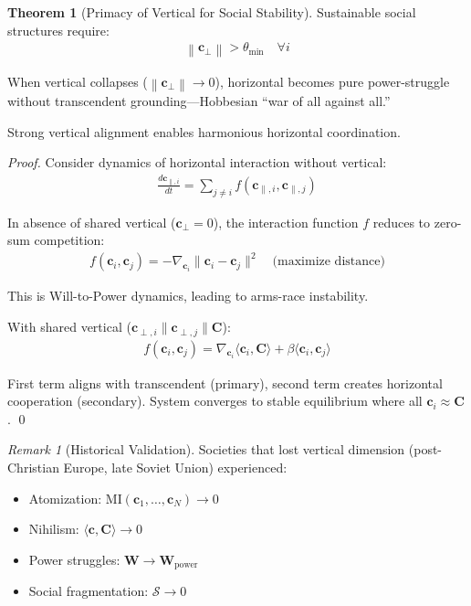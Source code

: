 \documentclass[11pt,a4paper]{article}
\theoremstyle{definition}
\newtheorem{theorem}{Theorem}[section]
\theoremstyle{remark}
\newtheorem{remark}{Remark}[section]
\newcommand{\WW}{\mathbf{W}}
\newcommand{\cc}{\mathbf{c}}
\newcommand{\norm}[1]{\left\|#1\right\|}
\begin{document}
\begin{enumerate}
\begin{theorem}[Primacy of Vertical for Social Stability]
Sustainable social structures require:
\begin{align}
\norm{\cc_{\perp}} > \theta_{\min} \quad \forall i
\end{align}

When vertical collapses (\(\norm{\cc_{\perp}} \to 0\)), horizontal becomes pure power-struggle without transcendent grounding—Hobbesian ``war of all against all.''

Strong vertical alignment enables harmonious horizontal coordination.
\end{theorem}

\begin{proof}
Consider dynamics of horizontal interaction without vertical:
\begin{align}
\frac{d\cc_{\parallel,i}}{dt} = \sum_{j \neq i} f(\cc_{\parallel,i}, \cc_{\parallel,j})
\end{align}

In absence of shared vertical (\(\cc_{\perp} = 0\)), the interaction function \(f\) reduces to zero-sum competition:
\begin{align}
f(\cc_i, \cc_j) = -\nabla_{\cc_i} \|\cc_i - \cc_j\|^2 \quad \text{(maximize distance)}
\end{align}

This is Will-to-Power dynamics, leading to arms-race instability.

With shared vertical (\(\cc_{\perp,i} \parallel \cc_{\perp,j} \parallel \mathbf{C}\)):
\begin{align}
f(\cc_i, \cc_j) = \nabla_{\cc_i} \langle \cc_i, \mathbf{C} \rangle + \beta \langle \cc_i, \cc_j \rangle
\end{align}

First term aligns with transcendent (primary), second term creates horizontal cooperation (secondary). System converges to stable equilibrium where all \(\cc_i \approx \mathbf{C}\). \qed
\end{proof}

\begin{remark}[Historical Validation]
Societies that lost vertical dimension (post-Christian Europe, late Soviet Union) experienced:
\begin{itemize}
    \item Atomization: \(\text{MI}(\cc_1, \ldots, \cc_N) \to 0\)
    \item Nihilism: \(\langle \cc, \mathbf{C} \rangle \to 0\)
    \item Power struggles: \(\WW \to \WW_{\text{power}}\)
    \item Social fragmentation: \(\mathcal{S} \to 0\)
\end{itemize}


\end{remark}
\end{enumerate}
\end{document}
